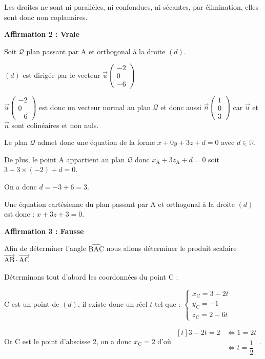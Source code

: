 \documentclass[10pt]{article}
\providecommand{\R}{\mathbb{R}}
\providecommand{\vect}[1]{\overrightarrow{#1}}
\begin{document}
Les droites ne sont ni parallèles, ni confondues, ni sécantes, par élimination, elles sont donc non coplanaires.

\bigskip

\textbf{Affirmation 2 : Vraie}

Soit $\mathcal{Q}$  plan passant par A et orthogonal à la droite $(d)$.

$(d)$ est dirigée par le vecteur $\vect{u}\begin{pmatrix}-2\\0\\-6\end{pmatrix}$

$\vect{u}\begin{pmatrix}-2\\0\\-6\end{pmatrix}$ est donc un vecteur normal au plan $\mathcal{Q}$  et donc aussi $\vect{n} \begin{pmatrix} 1\\0\\3 \end{pmatrix}$ car $\vect{u}$ et $\vect{n}$ sont colinéaires et non nuls.

Le plan $\mathcal{Q}$ admet donc une équation de la forme $x+ 0y + 3z + d = 0$ avec $d \in \R$. 

De plus, le point A appartient au plan $\mathcal{Q}$ donc $x_{\mathrm{A}}+3z_{\mathrm{A}}+d=0$ soit $3 +3\times (-2) +d=0$.

On a donc $d = -3 + 6 = 3$.

Une équation cartésienne du plan passant par A et orthogonal à la droite $(d)$  est donc : $x+3 z+3=0$.

\bigskip

\textbf{Affirmation 3 : Fausse}

Afin de déterminer l'angle $\widehat{\mathrm{BAC}}$ nous allons déterminer le produit scalaire $\vect {\mathrm{AB}} \cdot \vect {\mathrm{AC}}$

Déterminons tout d'abord les coordonnées du point C :

C est un point de $(d)$, il existe donc un réel $t$ tel que  : $\left\{\begin{array}{l}
x_{\mathrm{C}}=3-2t \\
y_{\mathrm{C}}=-1 \\
z_{\mathrm{C}}=2-6t
\end{array} \right.$

Or C est le point d'abscisse 2, on  a donc $x_{\mathrm{C}}=2$ d'où  $\begin{aligned}[t] 3-2t=2 & \iff 1= 2t \\ & \iff t=\dfrac12\end{aligned}$.
\end{document}
